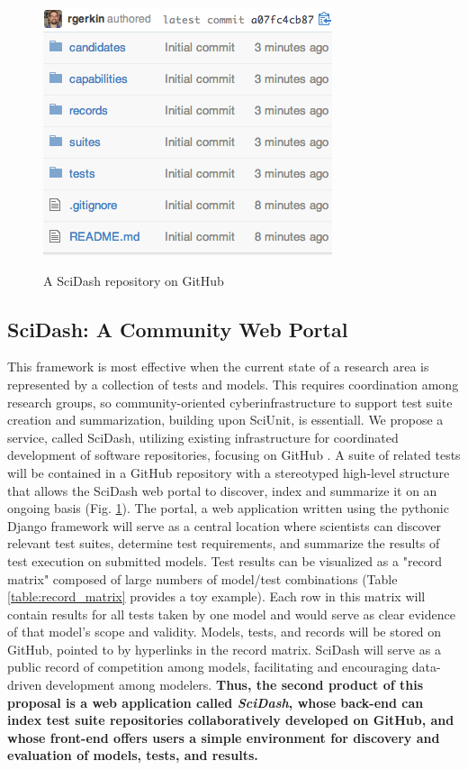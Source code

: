 \documentclass[11pt,letterpaper]{article}
\begin{document}
\begin{figure}
\centering
\includegraphics[scale=0.7]{scidash_github.png}
\label{fig:scidash_repo}
\caption{A SciDash repository on GitHub}
\end{figure}
\leavevmode
{}    

\subsection{SciDash: A Community Web Portal}
This framework is most effective when the current state of a research area is represented by a collection of tests and models. This requires coordination among research groups, so community-oriented cyberinfrastructure to support test suite creation and summarization, building upon SciUnit, is essentiall. We propose a service, called SciDash, utilizing existing infrastructure for coordinated development of software repositories, focusing on GitHub \cite{github_url} \cite{ram_git_2013}. A suite of related tests will be contained in a GitHub repository with a stereotyped high-level structure that allows the SciDash web portal to discover, index and summarize it on an ongoing basis (Fig. \ref{fig:scidash_repo}). The portal, a web application written using the pythonic Django framework \cite{django_url} will serve as a central location where scientists can discover relevant test suites, determine test requirements, and summarize the results of test execution on submitted models. Test results can be visualized as a "record matrix" composed of large numbers of model/test combinations (Table \ref{table:record_matrix} provides a toy example).  Each row in this matrix will contain results for all tests taken by one model and would serve as clear evidence of that model's scope and validity.  Models, tests, and records will be stored on GitHub, pointed to by hyperlinks in the record matrix. SciDash will serve as a public record of competition among models, facilitating and encouraging data-driven development among modelers. \textbf{Thus, the second product of this proposal is a web application called \textit{SciDash}, whose back-end can index test suite repositories collaboratively developed on GitHub, and whose front-end offers users a simple environment for discovery and evaluation of models, tests, and results.}  
\end{document}
